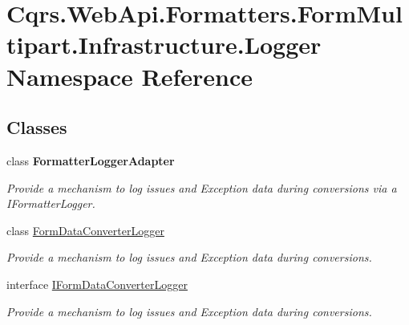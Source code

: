 \hypertarget{namespaceCqrs_1_1WebApi_1_1Formatters_1_1FormMultipart_1_1Infrastructure_1_1Logger}{}\section{Cqrs.\+Web\+Api.\+Formatters.\+Form\+Multipart.\+Infrastructure.\+Logger Namespace Reference}
\label{namespaceCqrs_1_1WebApi_1_1Formatters_1_1FormMultipart_1_1Infrastructure_1_1Logger}
\subsection*{Classes}
\begin{DoxyCompactItemize}
\item 
class {\bfseries Formatter\+Logger\+Adapter}
\begin{DoxyCompactList}\small\item\em Provide a mechanism to log issues and Exception data during conversions via a I\+Formatter\+Logger. \end{DoxyCompactList}\item 
class \hyperlink{classCqrs_1_1WebApi_1_1Formatters_1_1FormMultipart_1_1Infrastructure_1_1Logger_1_1FormDataConverterLogger}{Form\+Data\+Converter\+Logger}
\begin{DoxyCompactList}\small\item\em Provide a mechanism to log issues and Exception data during conversions. \end{DoxyCompactList}\item 
interface \hyperlink{interfaceCqrs_1_1WebApi_1_1Formatters_1_1FormMultipart_1_1Infrastructure_1_1Logger_1_1IFormDataConverterLogger}{I\+Form\+Data\+Converter\+Logger}
\begin{DoxyCompactList}\small\item\em Provide a mechanism to log issues and Exception data during conversions. \end{DoxyCompactList}\end{DoxyCompactItemize}
